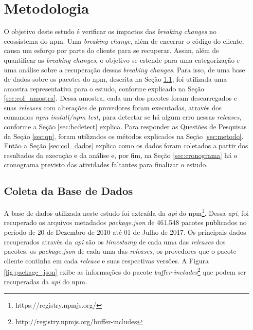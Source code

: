 \chapter{Metodologia}
\label{cap:metodologia}

O objetivo deste estudo é verificar os impactos das \textit{breaking changes} no ecossistema do \gls{npm}. Uma \textit{breaking change}, além de encerrar o código do cliente, causa um esforço por parte do cliente para se recuperar. Assim, além de quantificar as \textit{breaking changes}, o objetivo se estende para uma categorização e uma análise sobre a recuperação dessas \textit{breaking changes}. Para isso, de uma base de dados sobre os pacotes do \gls{npm}, descrita na Seção \ref{sec:col_base}, foi utilizada uma amostra representativa para o estudo, conforme explicado na Seção \ref{sec:col_amostra}. Dessa amostra, cada um dos pacotes foram descarregados e suas \textit{releases} com alterações de provedores foram executadas, através dos comandos \textit{npm install/npm test}, para detectar se há algum erro nessas \textit{releases}, conforme a Seção \ref{sec:bcdetect} explica. Para responder as Questões de Pesquisas da Seção \ref{sec:qp}, foram utilizados os métodos explicados na Seção \ref{sec:metodo}. Então a Seção \ref{sec:col_dados} explica como os dados foram coletados a partir dos resultados da execução e da análise e, por fim, na Seção \ref{sec:cronograma} há o cronograma previsto das atividades faltantes para finalizar o estudo.

\section{Coleta da Base de Dados}
\label{sec:col_base}
A base de dados utilizada neste estudo foi extraída da \textit{api} do \gls{npm}\footnote{https://registry.npmjs.org/}. Dessa \textit{api}, foi recuperado os arquivos metadados \textit{package.json} de 461,548 pacotes publicados no período de 20 de Dezembro de 2010 até 01 de Julho de 2017. Os principais dados recuperados através da \textit{api} são os \textit{timestamp} de cada uma das \textit{releases} dos pacotes, os \textit{package.json} de cada uma das \textit{releases}, os provedores que o pacote cliente continha em cada \textit{release} e suas respectivas versões. A Figura \ref{fig:package_json} exibe as informações do pacote \textit{buffer-includes}\footnote{http://registry.npmjs.org/buffer-includes} que podem ser recuperadas da \textit{api} do \gls{npm}.

